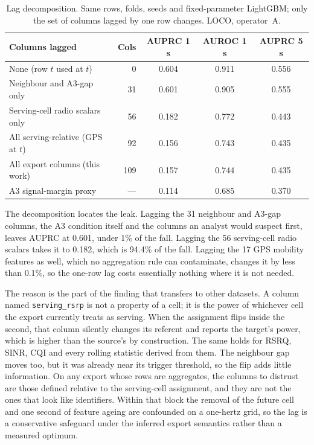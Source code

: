 \documentclass[5p,times,twocolumn]{elsarticle}
\begin{document}
\begin{table}[t]
\centering
\caption{Lag decomposition. Same rows, folds, seeds and fixed-parameter LightGBM; only the set of columns lagged by one row changes. LOCO, operator~A.}
\label{tab:cost}
\footnotesize
\setlength{\tabcolsep}{3pt}
\begin{tabularx}{\linewidth}{X r c c c}
\toprule
\textbf{Columns lagged} & \textbf{Cols} & \textbf{AUPRC 1 s} & \textbf{AUROC 1 s} & \textbf{AUPRC 5 s} \\
\midrule
None (row $t$ used at $t$) & 0 & 0.604 & 0.911 & 0.556 \\
Neighbour and A3-gap only & 31 & 0.601 & 0.905 & 0.555 \\
Serving-cell radio scalars only & 56 & 0.182 & 0.772 & 0.443 \\
All serving-relative (GPS at $t$) & 92 & 0.156 & 0.743 & 0.435 \\
All export columns (this work) & 109 & 0.157 & 0.744 & 0.435 \\
\midrule
A3 signal-margin proxy & --- & 0.114 & 0.685 & 0.370 \\
\bottomrule
\end{tabularx}
\end{table}

The decomposition locates the leak. Lagging the 31 neighbour and A3-gap columns, the A3 condition itself and the columns an analyst would suspect first, leaves AUPRC at 0.601, under 1\% of the fall. Lagging the 56 serving-cell radio scalars takes it to 0.182, which is 94.4\% of the fall. Lagging the 17 GPS mobility features as well, which no aggregation rule can contaminate, changes it by less than 0.1\%, so the one-row lag costs essentially nothing where it is not needed.

The reason is the part of the finding that transfers to other datasets. A column named \texttt{serving\_rsrp} is not a property of a cell; it is the power of whichever cell the export currently treats as serving. When the assignment flips inside the second, that column silently changes its referent and reports the target's power, which is higher than the source's by construction. The same holds for RSRQ, SINR, CQI and every rolling statistic derived from them. The neighbour gap moves too, but it was already near its trigger threshold, so the flip adds little information. On any export whose rows are aggregates, the columns to distrust are those defined relative to the serving-cell assignment, and they are not the ones that look like identifiers. Within that block the removal of the future cell and one second of feature ageing are confounded on a one-hertz grid, so the lag is a conservative safeguard under the inferred export semantics rather than a measured optimum.
\end{document}
